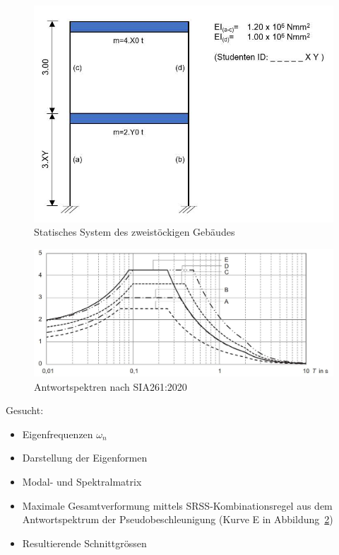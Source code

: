 \documentclass[
  letterpaper,
  DIV=11]{scrreprt}
\providecommand{\tightlist}{%
  \setlength{\itemsep}{0pt}\setlength{\parskip}{0pt}}\usepackage{longtable,booktabs,array}
\begin{document}
\begin{figure}[H]

{\centering \includegraphics{bilder/zweistoeckig_objekt.jpg}

}

\caption{\label{fig-zweistock}Statisches System des zweistöckigen
Gebäudes}

\end{figure}

\begin{figure}[H]

{\centering \includegraphics{bilder/antwortspektren_norm.jpg}

}

\caption{\label{fig-antwortspektren}Antwortspektren nach SIA261:2020}

\end{figure}

Gesucht:

\begin{itemize}
\tightlist
\item
  Eigenfrequenzen \(\omega_n\)
\item
  Darstellung der Eigenformen
\item
  Modal- und Spektralmatrix
\item
  Maximale Gesamtverformung mittels SRSS-Kombinationsregel aus dem
  Antwortspektrum der Pseudobeschleunigung (Kurve E in
  Abbildung~\ref{fig-antwortspektren})
\item
  Resultierende Schnittgrössen
\end{itemize}
\end{document}
